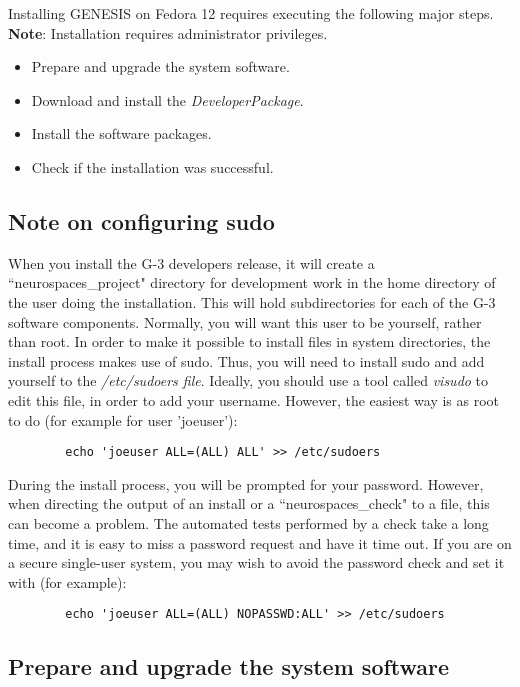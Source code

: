 \documentclass[12pt]{article}
\begin{document}
Installing GENESIS on Fedora 12 requires executing the following major steps. {\bf Note}: Installation requires administrator privileges.
\begin{itemize}
   \item[] Prepare and upgrade the system software.
   \item[] Download and install the {\it DeveloperPackage}.
   \item[] Install the software packages.
   \item[] Check if the installation was successful. 
\end{itemize}


\subsection*{Note on configuring sudo}

When you install the G-3 developers release, it will create a
``neurospaces\_project" directory for development work in the home directory
of the user doing the installation.  This will hold subdirectories for each
of the G-3 software components.  Normally, you will want this user to be
yourself, rather than root.  In order to make it possible to install files
in system directories, the install process makes use of sudo.  Thus, you
will need to install sudo and add yourself to the {\it /etc/sudoers file}.
Ideally, you should use a tool called {\it visudo} to edit this file,
in order to add your username.  However, the easiest way is as root to do (for
example for user 'joeuser'):

\begin{verbatim}
        echo 'joeuser ALL=(ALL) ALL' >> /etc/sudoers
\end{verbatim}

During the install process, you will be prompted for your password.
However, when directing the output of an install or a
``neurospaces\_check" to a file, this can become a problem. The automated
tests performed by a check take a long time, and it is easy to
miss a password request and have it time out.  If you are on a secure
single-user system, you may wish to avoid the password check and set
it with (for example):

\begin{verbatim}
        echo 'joeuser ALL=(ALL) NOPASSWD:ALL' >> /etc/sudoers
\end{verbatim}

\subsection*{Prepare and upgrade the system software}
\end{document}
